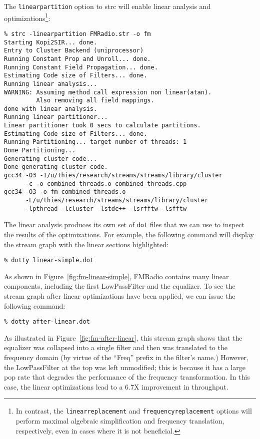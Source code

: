 The {\tt linearpartition} option to strc will enable linear analysis
and optimizations\footnote{In contrast, the {\tt linearreplacement}
and {\tt frequencyreplacement} options will perform maximal algebraic
simplification and frequency translation, respectively, even in cases
where it is not beneficial.}:
{\small
\begin{verbatim}
% strc -linearpartition FMRadio.str -o fm
Starting Kopi2SIR... done.
Entry to Cluster Backend (uniprocessor)
Running Constant Prop and Unroll... done.
Running Constant Field Propagation... done.
Estimating Code size of Filters... done.
Running linear analysis... 
WARNING: Assuming method call expression non linear(atan). 
         Also removing all field mappings.
done with linear analysis.
Running linear partitioner...
Linear partitioner took 0 secs to calculate partitions.
Estimating Code size of Filters... done.
Running Partitioning... target number of threads: 1
Done Partitioning...
Generating cluster code...
Done generating cluster code.
gcc34 -O3 -I/u/thies/research/streams/streams/library/cluster 
      -c -o combined_threads.o combined_threads.cpp
gcc34 -O3 -o fm combined_threads.o 
      -L/u/thies/research/streams/streams/library/cluster 
      -lpthread -lcluster -lstdc++ -lsrfftw -lsfftw
\end{verbatim}
} 
%
The linear analysis produces its own set of {\tt dot} files that we
can use to inspect the results of the optimizations.  For example, the
following command will display the stream graph with the linear
sections highlighted: {\small
\begin{verbatim}
% dotty linear-simple.dot
\end{verbatim}
} 
%
As shown in Figure~\ref{fig:fm-linear-simple}, FMRadio contains many
linear components, including the first LowPassFilter and the
equalizer.  To see the stream graph after linear optimizations have
been applied, we can issue the following command:
{\small
\begin{verbatim}
% dotty after-linear.dot
\end{verbatim}
} 
%
As illustrated in Figure~\ref{fig:fm-after-linear}, this stream
graph shows that the equalizer was collapsed into a single filter and
then was translated to the frequency domain (by virtue of the ``Freq''
prefix in the filter's name.)  However, the LowPassFilter at the top
was left unmodified; this is because it has a large pop rate that
degrades the performance of the frequency transformation.  In this
case, the linear optimizations lead to a 6.7X improvement in
throughput.

